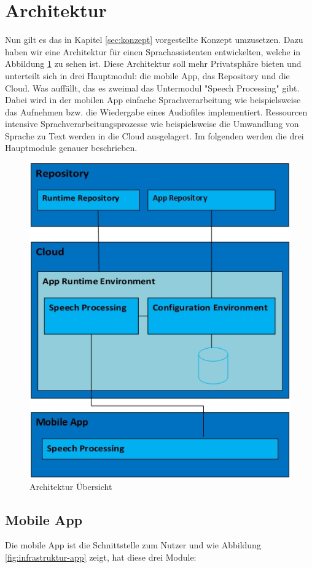 \section{Architektur}
Nun gilt es das in Kapitel \ref{sec:konzept} vorgestellte Konzept umzusetzen. Dazu haben wir eine Architektur für einen Sprachassistenten entwickelten, welche in Abbildung \ref{fig:infrastruktur-overview} zu sehen ist. Diese Architektur soll mehr Privatsphäre bieten und unterteilt sich in drei Hauptmodul: die mobile App, das Repository und die Cloud. Was auffällt, das es zweimal das Untermodul "Speech Processing" gibt. Dabei wird in der mobilen App einfache Sprachverarbeitung wie beispielsweise das Aufnehmen bzw. die Wiedergabe eines Audiofiles implementiert. Ressourcen intensive Sprachverarbeitungsprozesse wie beispielsweise die Umwandlung von Sprache zu Text werden in die Cloud ausgelagert. Im folgenden werden die drei Hauptmodule genauer beschrieben.
\begin{figure}[h!]
	\centering
	\includegraphics[width=0.7\linewidth]{Picture/Infrastruktur-Overview.jpg}
	\caption[Architektur Übersicht]{Architektur Übersicht}
	\label{fig:infrastruktur-overview}
\end{figure}

\subsection{Mobile App}
Die mobile App ist die Schnittstelle zum Nutzer und wie Abbildung \ref{fig:infrastruktur-app} zeigt, hat diese drei Module:

